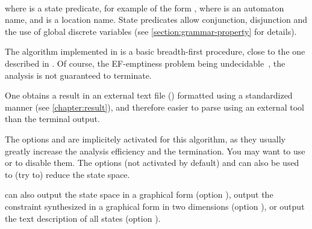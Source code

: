 \\
where  is a state predicate, for example of the form , where  is an automaton name, and  is a location name.
State predicates allow conjunction, disjunction and the use of global discrete variables (see \cref{section:grammar-property} for details).



The algorithm \EFsynth{} implemented in \imitator{} is a basic breadth-first procedure, close to the one described in \cite{JLR15}.
Of course, the EF-emptiness problem being undecidable~\cite{AHV93}, the analysis is not guaranteed to terminate.

%

One obtains a result in an external text file () formatted using a standardized manner (see \cref{chapter:result}), and therefore easier to parse using an external tool than the terminal output.

The options  and  are implicitely activated for this algorithm, as they usually greatly increase the analysis efficiency and the termination.
You may want to use  or  to disable them.
The options  (not activated by default) and  can also be used to (try to) reduce the state space.

\imitator{} can also
output the state space in a graphical form (option ),
output the constraint synthesized in a graphical form in two dimensions (option ),
or
output the text description of all states (option ).


